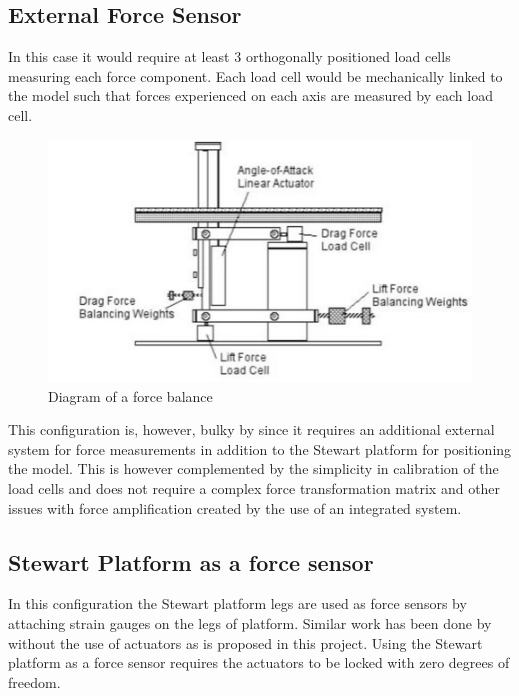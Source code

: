 \subsection{External Force Sensor}
In this case it would require at least 3 orthogonally positioned load cells measuring each force component. Each load cell would be mechanically linked to the model such that forces experienced on each axis are measured by each load cell. 
\begin{center}
	\begin{figure}[!h]
		\centering
		\includegraphics{Figures/modBal}
		\caption[Diagram of a force balance]{Diagram of a force balance \cite{post_force_2010}}
	\end{figure}
\end{center}
This configuration is, however, bulky by since it requires an additional external system for force measurements in addition to the Stewart platform for positioning the model. This is however complemented by the simplicity in calibration of the load cells and does not require a complex force transformation matrix and other issues with force amplification created by the use of an integrated system.
\subsection{Stewart Platform as a force sensor}
In this configuration the Stewart platform legs are used as force sensors by attaching strain gauges on the legs of platform. Similar work has been done by \cite{ferreira2015design} without the use of actuators as is proposed in this project. Using the Stewart platform as a force sensor requires the actuators to be locked with zero degrees of freedom.

